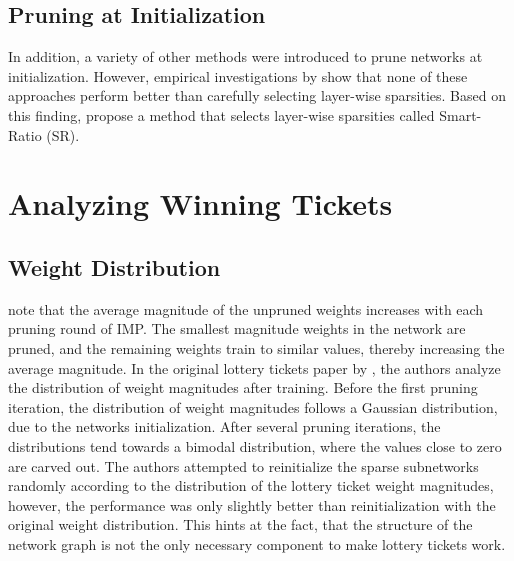 \subsection{Pruning at Initialization}
In addition, a variety of other methods \autocite{GraSP, SNIP, SynFlow} were introduced to prune networks at initialization. 
However, empirical investigations by \textcite{PruningAtInitMissingTheMark, SanityCheckingPruningMethods} show that none of these approaches perform better than carefully selecting layer-wise sparsities.
Based on this finding, \autocite{SanityCheckingPruningMethods} propose a method that selects layer-wise sparsities called Smart-Ratio (SR).

\section{Analyzing Winning Tickets}
\subsection{Weight Distribution}
\textcite{maene_towards_2021} note that the average magnitude of the unpruned weights increases with each pruning round of {IMP}.
The smallest magnitude weights in the network are pruned, and the remaining weights train to similar values, thereby increasing the average magnitude.
In the original lottery tickets paper by \textcite{LTH}, the authors analyze the distribution of weight magnitudes after training.
Before the first pruning iteration, the distribution of weight magnitudes follows a Gaussian distribution, due to the networks initialization.
After several pruning iterations, the distributions tend towards a bimodal distribution, where the values close to zero are carved out.
The authors attempted to reinitialize the sparse subnetworks randomly according to the distribution of the lottery ticket weight magnitudes, however, the performance was only slightly better than reinitialization with the original weight distribution.
This hints at the fact, that the structure of the network graph is not the only necessary component to make lottery tickets work.

